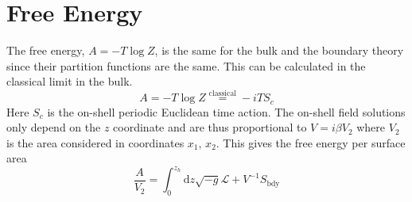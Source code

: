 \documentclass[12pt]{report}
\renewcommand{\d}{\ensuremath{\mathrm{d}}}
\renewcommand{\L}{\ensuremath{\mathcal{L}}}
\renewcommand{\i}{\ensuremath{i}}
\begin{document}
\section{Free Energy}
The free energy, $A=-T\log{Z}$, is the same for the bulk and the boundary theory since their partition functions are the same. This can be calculated in the classical limit in the bulk.
\begin{equation}
 A=-T\log{Z}\stackrel{\mathrm{classical}}{=}-\i T S_c
\end{equation}
Here $S_c$ is the on-shell periodic Euclidean time action. The on-shell field solutions only depend on the $z$ coordinate and are thus proportional to $V=\i\beta V_2$ where $V_2$ is the area considered in coordinates $x_1$, $x_2$. This gives the free energy per surface area
\begin{equation}
 \frac{A}{V_2}=\int_0^{z_h}\d z \sqrt{-g}\L+V^{-1}S_{\mathrm{bdy}}
\end{equation}
\end{document}
